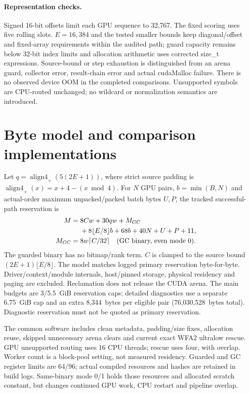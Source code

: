 \documentclass[11pt,a4paper]{article}
\begin{document}
\paragraph{Representation checks.} Signed 16-bit offsets limit each GPU sequence to 32,767. The fixed scoring uses five rolling slots. $E=16,384$ and the tested smaller bounds keep diagonal/offset and fixed-array requirements within the audited path; guard capacity remains below 32-bit index limits and allocation arithmetic uses corrected size\_t expressions. Source-bound or step exhaustion is distinguished from an arena guard, collector error, result-chain error and actual cudaMalloc failure. There is no observed device OOM in the completed comparisons. Unsupported symbols are CPU-routed unchanged; no wildcard or normalization semantics are introduced.

\section{Byte model and comparison implementations}
Let $q=\operatorname{align4}_{+}(5(2E+1))$, where strict source padding is $\operatorname{align4}_{+}(x)=x+4-(x\bmod4)$. For $N$ GPU pairs, $b=\min(B,N)$ and actual-order maximum unpacked/packed batch bytes $U,P$, the tracked successful-path reservation is
\begin{align*}
M={}&8Cw+30qw+M_{GC}\\
 &+8\lfloor E/8\rfloor b+68b+40N+U+P+11,\\
M_{GC}={}&8w\lceil C/32\rceil\quad\hbox{(GC binary, even mode 0)}.
\end{align*}
The guarded binary has no bitmap/rank term. $C$ is clamped to the source bound $(2E+1)\lfloor E/8\rfloor$. The model matches logged primary reservation byte-for-byte. Driver/context/module internals, host/pinned storage, physical residency and paging are excluded. Reclamation does not release the CUDA arena. The main budgets are 3/5.5~GiB reservation caps; detailed diagnostics use a separate 6.75~GiB cap and an extra 8,344~bytes per eligible pair (76,030,528~bytes total). Diagnostic reservation must not be quoted as primary reservation.

The common software includes clean metadata, padding/size fixes, allocation reuse, skipped unnecessary arena clears and current exact WFA2 ultralow rescue. GPU unsupported routing uses 16 CPU threads; rescue uses four, with overlap. Worker count is a block-pool setting, not measured residency. Guarded and GC register limits are 64/96; actual compiled resources and hashes are retained in build logs. Same-binary mode 0/1 holds those resources and allocated scratch constant, but changes continued GPU work, CPU restart and pipeline overlap.
\end{document}
